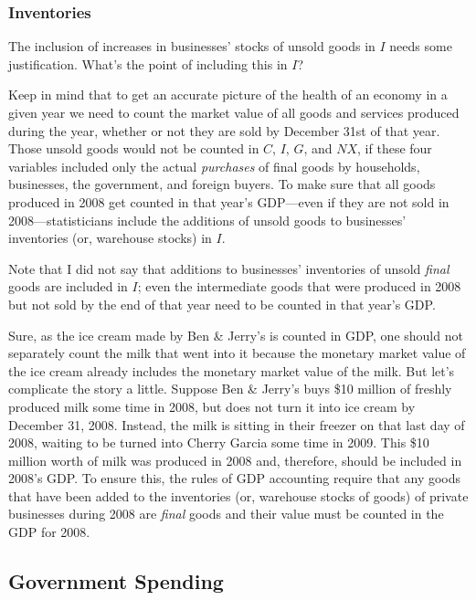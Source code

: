 \documentclass[
  letterpaper,
]{book}
\theoremstyle{plain}
\theoremstyle{remark}
\begin{document}
\subsubsection{Inventories}\label{sec-inventories}


The inclusion of increases in businesses' stocks of unsold goods in
\(I\) needs some justification. What's the point of including this in
\(I\)?

Keep in mind that to get an accurate picture of the health of an economy
in a given year we need to count the market value of all goods and
services produced during the year, whether or not they are sold by
December 31st of that year. Those unsold goods would not be counted in
\(C\), \(I\), \(G\), and \(NX\), if these four variables included only
the actual \emph{purchases} of final goods by households, businesses,
the government, and foreign buyers. To make sure that all goods produced
in 2008 get counted in that year's GDP---even if they are not sold in
2008---statisticians include the additions of unsold goods to
businesses' inventories (or, warehouse stocks) in \(I\).

Note that I did not say that additions to businesses' inventories of
unsold \emph{final} goods are included in \(I\); even the intermediate
goods that were produced in 2008 but not sold by the end of that year
need to be counted in that year's GDP.

Sure, as the ice cream made by Ben \& Jerry's is counted in GDP, one
should not separately count the milk that went into it because the
monetary market value of the ice cream already includes the monetary
market value of the milk. But let's complicate the story a little.
Suppose Ben \& Jerry's buys \$10 million of freshly produced milk some
time in 2008, but does not turn it into ice cream by December 31, 2008.
Instead, the milk is sitting in their freezer on that last day of 2008,
waiting to be turned into Cherry Garcia some time in 2009. This \$10
million worth of milk was produced in 2008 and, therefore, should be
included in 2008's GDP. To ensure this, the rules of GDP accounting
require that any goods that have been added to the inventories (or,
warehouse stocks of goods) of private businesses during 2008 are
\emph{final} goods and their value must be counted in the GDP for 2008.

\subsection{Government Spending}\label{sec-government-spending-nia}
\end{document}
